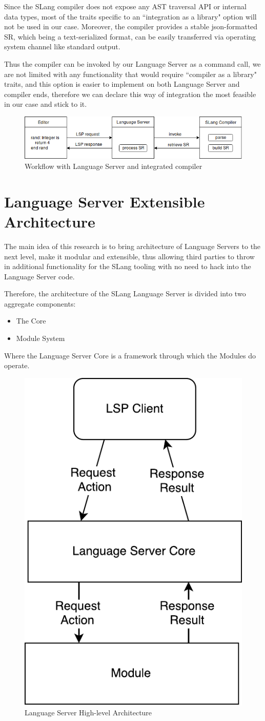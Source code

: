 Since the SLang\cite{Zouev2017} compiler does not expose any AST traversal API or internal data types, most of 
the traits specific to an ``integration as a library" option will not be used in our case.
Moreover, the compiler provides a stable json-formatted SR, which being a text-serialized format, 
can be easily transferred via operating system channel like standard output\cite{TheOpenGroup1997}.

Thus the compiler can be invoked by our Language Server as a command call, we are not limited 
with any functionality that would require ``compiler as a library" traits, and this option
is easier to implement on both Language Server and compiler ends,
therefore we can declare this way of integration the most feasible in our case and stick to it.

\begin{figure}[H]
    \centering
    \includegraphics[width=1.0\textwidth]{figs/compiler_integration.png}
    \caption{Workflow with Language Server and integrated compiler}
\end{figure}

\section{Language Server Extensible Architecture}
\label{sec:met:arch}
The main idea of this research is to bring architecture of Language Servers to the next level,
make it modular and extensible, thus allowing third parties to throw in additional functionality for the SLang tooling
with no need to hack into the Language Server code.

Therefore, the architecture of the SLang Language Server is divided into two aggregate components:
\begin{itemize}
    \item The Core
    \item Module System 
\end{itemize}
Where the Language Server Core is a framework through which the Modules do operate.

\begin{figure}[H]
    \centering
    \includegraphics[width=.3\textwidth]{figs/highlevel_architecture.pdf}
    \caption{Language Server High-level Architecture}
\end{figure}

